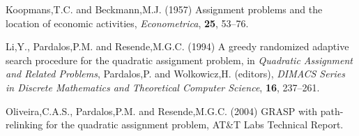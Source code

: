 \documentclass{bioinfo}
\begin{document}
\begin{thebibliography}{}
 Koopmans,T.C. and Beckmann,M.J. (1957) Assignment problems and the location of economic activities, {\it Econometrica}, {\bf 25}, 53--76.

 Li,Y., Pardalos,P.M. and Resende,M.G.C. (1994) A greedy randomized adaptive search procedure for the quadratic assignment problem, in {\it Quadratic Assignment and Related Problems}, Pardalos,P. and Wolkowicz,H. (editors), {\it DIMACS Series in Discrete Mathematics and Theoretical Computer Science}, {\bf 16}, 237--261.

 Oliveira,C.A.S., Pardalos,P.M. and Resende,M.G.C. (2004) GRASP with path-relinking for the quadratic assignment problem, AT\&T Labs Technical Report.

\end{thebibliography}
\end{document}

